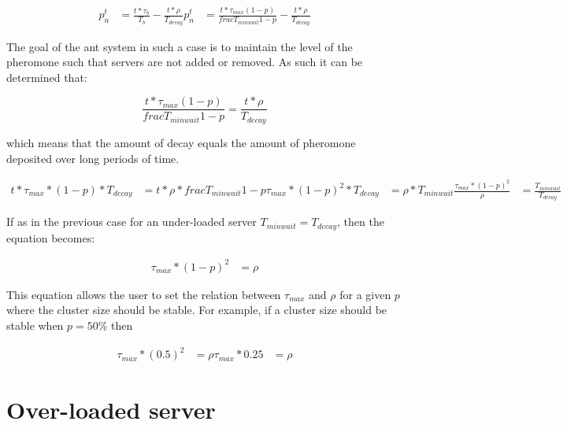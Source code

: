 \begin{equation}
\begin{aligned}
p^{t}_{n} &= \frac{t *  \tau_{b}}{T_{b}} - \frac{t *  \rho}{T_{decay}}
p^{t}_{n} &= \frac{t *  \tau_{max}(1 - p)}{frac{T_{minwait}}{1 - p}} - \frac{t *  \rho}{T_{decay}}
\end{aligned}
\end{equation}

The goal of the ant system in such a case is to maintain the level of the pheromone such that servers are not added or removed. As such it can be determined that:

\begin{equation}
\frac{t *  \tau_{max}(1 - p)}{frac{T_{minwait}}{1 - p}} = \frac{t *  \rho}{T_{decay}}
\end{equation}

which means that the amount of decay equals the amount of pheromone deposited over long periods of time.

\begin{equation}
\begin{aligned}
t *  \tau_{max} * (1 - p) * T_{decay} &= t *  \rho * frac{T_{minwait}}{1 - p}
\tau_{max} * (1 - p)^2 * T_{decay} &= \rho * T_{minwait}
\frac{\tau_{max} * (1 - p)^2}{\rho} &= \frac{T_{minwait}}{T_{decay}}
\end{aligned}
\end{equation}

If as in the previous case for an under-loaded server $T_{minwait} = T_{decay}$, then the equation becomes:

\begin{equation}
\begin{aligned}
\tau_{max} * (1 - p)^2 &= \rho
\end{aligned}
\end{equation}

This equation allows the user to set the relation between $\tau_{max}$ and $\rho$ for a given $p$ where the cluster size should be stable. For example, if a cluster size should be stable when $p = 50\%$ then

\begin{equation}
\begin{aligned}
\tau_{max} * (0.5)^2 &= \rho
\tau_{max} * 0.25 &= \rho
\end{aligned}
\end{equation}

\section{Over-loaded server}

